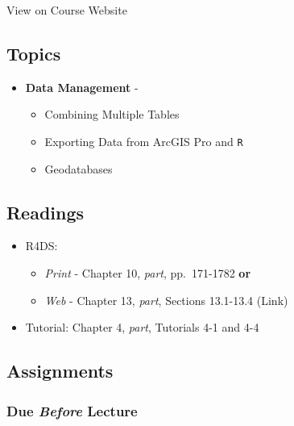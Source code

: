 \documentclass[
]{book}
\providecommand{\tightlist}{%
  \setlength{\itemsep}{0pt}\setlength{\parskip}{0pt}}
\begin{document}
View on Course Website

\hypertarget{topics-8}{%
\subsection*{Topics}\label{topics-8}}

\begin{itemize}
\tightlist
\item
  \textbf{Data Management} -

  \begin{itemize}
  \tightlist
  \item
    Combining Multiple Tables
  \item
    Exporting Data from ArcGIS Pro and \texttt{R}
  \item
    Geodatabases
  \end{itemize}
\end{itemize}

\hypertarget{readings-9}{%
\subsection*{Readings}\label{readings-9}}

\begin{itemize}
\tightlist
\item
  R4DS:

  \begin{itemize}
  \tightlist
  \item
    \emph{Print} - Chapter 10, \emph{part}, pp.~171-1782 \textbf{or}
  \item
    \emph{Web} - Chapter 13, \emph{part}, Sections 13.1-13.4 (Link)
  \end{itemize}
\item
  Tutorial: Chapter 4, \emph{part}, Tutorials 4-1 and 4-4
\end{itemize}

\hypertarget{assignments-9}{%
\subsection*{Assignments}\label{assignments-9}}

\hypertarget{due-before-lecture-7}{%
\subsubsection*{\texorpdfstring{Due \emph{Before} Lecture}{Due Before Lecture}}\label{due-before-lecture-7}}
\end{document}
